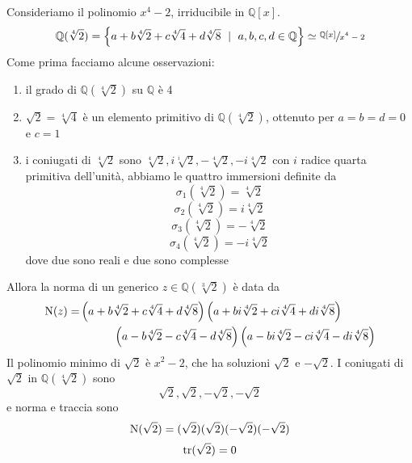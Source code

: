 \begin{esempio}
		Consideriamo il polinomio $x^4-2$, irriducibile in $\mathbb{Q}[x]$.
		\begin{equation*}
		\mathbb{Q}(\sqrt[4]{2})=\left\{a+b\sqrt[4]{2}+c\sqrt[4]{4}+d\sqrt[4]{8} \ \mid \ a,b,c,d\in\mathbb{Q}\right\}\simeq\sfrac{\mathbb{Q}[x]}{x^4-2}
		\end{equation*}
		Come prima facciamo alcune osservazioni:
		\begin{enumerate}
			\item il grado di $\mathbb{Q}(\sqrt[4]{2})$ su $\mathbb{Q}$ è 4
			\item $\sqrt{2}=\sqrt[4]{4}$ è un elemento primitivo di $\mathbb{Q}(\sqrt[4]{2})$, ottenuto per $a=b=d=0$ e $c=1$
			\item i coniugati di $\sqrt[4]{2}$ sono $\sqrt[4]{2},i\sqrt[i]{2},-\sqrt[4]{2},-i\sqrt[4]{2}$ con $i$ radice quarta primitiva dell'unità, abbiamo le quattro immersioni definite da
			\begin{equation*}
			\sigma_1(\sqrt[4]{2})=\sqrt[4]{2}
			\end{equation*}
			\begin{equation*}
			\sigma_2(\sqrt[4]{2})=i\sqrt[4]{2}
			\end{equation*}
			\begin{equation*}
			\sigma_3(\sqrt[4]{2})=-\sqrt[4]{2}
			\end{equation*}
			\begin{equation*}
			\sigma_4(\sqrt[4]{2})=-i\sqrt[4]{2}
			\end{equation*}
			dove due sono reali e due sono complesse
		\end{enumerate}
		Allora la norma di un generico $z\in\mathbb{Q}(\sqrt[3]{2})$ è data da 
		\begin{align*}
		\operatorname{N}(z)=&
		\left(a+b\sqrt[4]{2}+c\sqrt[4]{4}+d\sqrt[4]{8}\right)
		\left(a+bi\sqrt[4]{2}+ci\sqrt[4]{4}+di\sqrt[4]{8}\right)\\
		&\ \ \ \ \ \ \ \ \ \left(a-b\sqrt[4]{2}-c\sqrt[4]{4}-d\sqrt[4]{8}\right)
		\left(a-bi\sqrt[4]{2}-ci\sqrt[4]{4}-di\sqrt[4]{8}\right)
		\end{align*}
		Il polinomio minimo di $\sqrt{2}$ è $x^2-2$, che ha soluzioni $\sqrt{2}$ e $-\sqrt{2}$. I coniugati di $\sqrt{2}$ in $\mathbb{Q}(\sqrt[4]{2})$ sono 
		\begin{equation*}
		\sqrt{2},\sqrt{2},-\sqrt{2},-\sqrt{2}
		\end{equation*}
		e norma e traccia sono 
		\begin{equation*}
		\operatorname{N}(\sqrt{2})=(\sqrt{2})(\sqrt{2})(-\sqrt{2})(-\sqrt{2})
		\end{equation*}
		\begin{equation*}
		\operatorname{tr}(\sqrt{2})=0
		\end{equation*}
\end{esempio}
